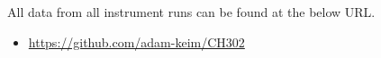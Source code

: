 \documentclass[journal=jacsat,manuscript=communication]{achemso}
\begin{document}
\begin{suppinfo}

All data from all instrument runs can be found at the below URL.
\begin{itemize}
  \item \url{https://github.com/adam-keim/CH302}
\end{itemize}

\end{suppinfo}

% 
\end{document}
